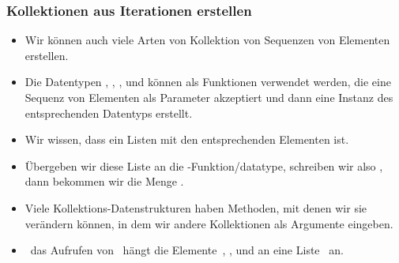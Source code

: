 \documentclass[aspectratio=169,mathserif,notheorems]{beamer}%
\begin{document}
\begin{frame}%
\frametitle{Kollektionen aus Iterationen erstellen}%
\begin{itemize}%
%
\item Wir können auch viele Arten von Kollektion von Sequenzen von Elementen erstellen.%
%
\item<2-> Die Datentypen  , , , und  können als Funktionen verwendet werden, die eine Sequenz von Elementen als Parameter akzeptiert und dann eine Instanz des entsprechenden Datentyps erstellt.%
%
\item<3-> Wir wissen, dass \pythonil{[1, 2, 2, 3]} ein Listen mit den entsprechenden Elementen ist.%
%
\item<4-> Übergeben wir diese Liste an die -Funktion/datatype, schreiben wir also , dann bekommen wir die Menge .%
%
\item<5-> Viele Kollektions-Datenstrukturen haben Methoden, mit denen wir sie verändern können, in dem wir andere Kollektionen als Argumente eingeben.%
%
\item<6-> \DEZB\ das Aufrufen von~ hängt die Elemente~, , und  an eine Liste~ an.%
%
\end{itemize}%
\end{frame}%
%
\end{document}
